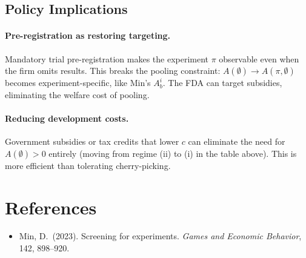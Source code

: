 \documentclass[12pt,a4paper]{article}
\begin{document}
\subsection{Policy Implications}

\paragraph{Pre-registration as restoring targeting.}
Mandatory trial pre-registration makes the experiment
$\pi$ observable even when the firm omits results. This
breaks the pooling constraint:
$A(\emptyset) \to A(\pi, \emptyset)$ becomes
experiment-specific, like Min's $A_b^i$. The FDA can
target subsidies, eliminating the welfare cost of pooling.

\paragraph{Reducing development costs.}
Government subsidies or tax credits that lower $c$
can eliminate the need for $A(\emptyset) > 0$ entirely
(moving from regime (ii) to (i) in the table above).
This is more efficient than tolerating cherry-picking.


\section*{References}

\begin{itemize}
  \item Min, D.\ (2023). Screening for experiments.
    \emph{Games and Economic Behavior}, 142, 898--920.
\end{itemize}
\end{document}
